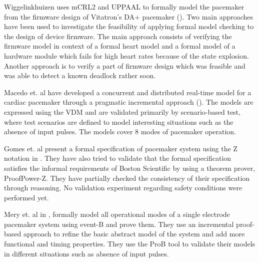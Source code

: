 Wiggelinkhuizen uses mCRL2 and UPPAAL to formally model the pacemaker from the firmware design of Vitatron's DA+ pacemaker (\cite{Wigg}). Two main approaches have been used to investigate the feasibility of applying formal model checking to the design of device firmware. The main approach consists of verifying the firmware model in context of a formal heart model and a formal model of a hardware module which fails for high heart rates because of the state explosion. Another approach is to verify a part of firmware design which was feasible and was able to detect a known deadlock rather soon.

Macedo et. al have developed a concurrent and distributed real-time model for a cardiac pacemaker through a pragmatic incremental approach (\cite{Macedo}). The models are expressed using the VDM and are validated primarily by scenario-based test, where test scenarios are defined to model interesting situations such as the absence of input pulses. The models cover 8 modes of pacemaker operation.

Gomes et. al present a formal specification of pacemaker system using the Z notation in \cite{Gomes}. They have also tried to validate that the formal specification satisfies the informal requirements of Boston Scientific by using a theorem prover, ProofPower-Z. They have partially checked the consistency of their specification through reasoning. No validation experiment regarding safety conditions were performed yet.

Mery et. al in \cite{Mery}, formally model all operational modes of a single electrode pacemaker system using event-B and prove them. They use an incremental proof-based approach to refine the basic abstract model of the system and add more functional and timing properties. They use the ProB tool to validate their models in different situations such as absence of input pulses. \\





